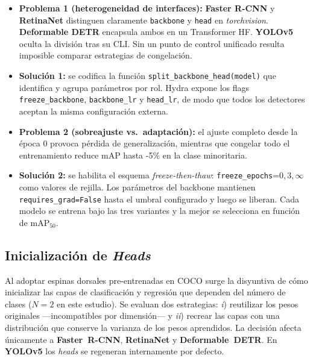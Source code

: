 \begin{itemize}
   \item \textbf{Problema 1 (heterogeneidad de interfaces):} \textbf{Faster R-CNN} y \textbf{RetinaNet} distinguen claramente \texttt{backbone} y \texttt{head} en \textit{torchvision}.
   \textbf{Deformable DETR} encapsula ambos en un Transformer HF.
   \textbf{YOLOv5} oculta la división tras su CLI.
   Sin un punto de control unificado resulta imposible comparar estrategias de congelación.
   \item \textbf{Solución 1:} se codifica la función \texttt{split\_backbone\_head(model)} que identifica y agrupa parámetros por rol.
   Hydra expone los flags \texttt{freeze\_backbone}, \texttt{backbone\_lr} y \texttt{head\_lr}, de modo que todos los detectores aceptan la misma configuración externa.
   \item \textbf{Problema 2 (sobreajuste vs.\ adaptación):} el ajuste completo desde la época 0 provoca pérdida de generalización, mientras que congelar todo el entrenamiento reduce \(\text{mAP}\) hasta -5\% en la clase minoritaria.
   \item \textbf{Solución 2:} se habilita el esquema \emph{freeze-then-thaw}:
         \texttt{freeze\_epochs}=0,\,3,\,\(\infty\) como valores de rejilla.
         Los parámetros del backbone mantienen \texttt{requires\_grad=False} hasta el umbral configurado y luego se liberan.
         Cada modelo se entrena bajo las tres variantes y la mejor se selecciona en función de \(\text{mAP}_{50}\).
\end{itemize}

\subsection{Inicialización de \emph{Heads}}\label{ssec:init_heads}

Al adoptar espinas dorsales pre-entrenadas en COCO surge la disyuntiva de cómo inicializar las capas de clasificación y regresión que dependen del número de clases (\(N=2\) en este estudio).
Se evaluan dos estrategias:
\emph{i}) reutilizar los pesos originales —incompatibles por dimensión— y
\emph{ii}) recrear las capas con una distribución que conserve la varianza de los pesos aprendidos.
La decisión afecta únicamente a \textbf{Faster~R-CNN}, \textbf{RetinaNet} y \textbf{Deformable~DETR}.
En \textbf{YOLOv5} los \emph{heads} se regeneran internamente por defecto.

